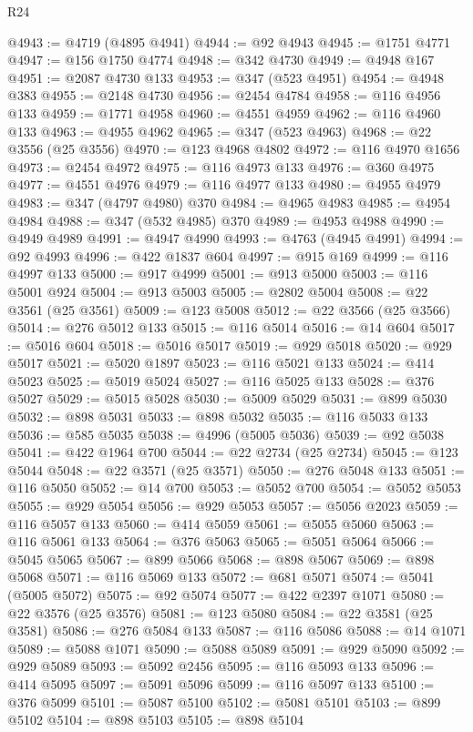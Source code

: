 \begin{lexlean}{R24}
\begin{coremodule}
{{{{{{{{{{{{{{{{{{{{{{{{{{{{{{{{{{{{{{{{{{{{{{{{{{{{{{{{{{{{{{{{{{{{{{{{{{{{{{{{{{{{{{{{{{{{{{{{{{{{{{{{{{{{{{{{{{{{{{{{{{{{{{{{{{{{{{{{{{{{{{{{{{{{{{{{{{{{{{{{{{{{{{{{{{{{{{{{{{{{{{{{{{{{{{{{{{{@4943 := @4719 (@4895 @4941)
@4944 := @92 @4943
@4945 := @1751 @4771
@4947 := @156 @1750 @4774
@4948 := @342 @4730
@4949 := @4948 @167
@4951 := @2087 @4730 @133
@4953 := @347 (@523 @4951)
@4954 := @4948 @383
@4955 := @2148 @4730
@4956 := @2454 @4784
@4958 := @116 @4956 @133
@4959 := @1771 @4958
@4960 := @4551 @4959
@4962 := @116 @4960 @133
@4963 := @4955 @4962
@4965 := @347 (@523 @4963)
@4968 := @22 @3556 (@25 @3556)
@4970 := @123 @4968 @4802
@4972 := @116 @4970 @1656
@4973 := @2454 @4972
@4975 := @116 @4973 @133
@4976 := @360 @4975
@4977 := @4551 @4976
@4979 := @116 @4977 @133
@4980 := @4955 @4979
@4983 := @347 (@4797 @4980) @370
@4984 := @4965 @4983
@4985 := @4954 @4984
@4988 := @347 (@532 @4985) @370
@4989 := @4953 @4988
@4990 := @4949 @4989
@4991 := @4947 @4990
@4993 := @4763 (@4945 @4991)
@4994 := @92 @4993
@4996 := @422 @1837 @604
@4997 := @915 @169
@4999 := @116 @4997 @133
@5000 := @917 @4999
@5001 := @913 @5000
@5003 := @116 @5001 @924
@5004 := @913 @5003
@5005 := @2802 @5004
@5008 := @22 @3561 (@25 @3561)
@5009 := @123 @5008
@5012 := @22 @3566 (@25 @3566)
@5014 := @276 @5012 @133
@5015 := @116 @5014
@5016 := @14 @604
@5017 := @5016 @604
@5018 := @5016 @5017
@5019 := @929 @5018
@5020 := @929 @5017
@5021 := @5020 @1897
@5023 := @116 @5021 @133
@5024 := @414 @5023
@5025 := @5019 @5024
@5027 := @116 @5025 @133
@5028 := @376 @5027
@5029 := @5015 @5028
@5030 := @5009 @5029
@5031 := @899 @5030
@5032 := @898 @5031
@5033 := @898 @5032
@5035 := @116 @5033 @133
@5036 := @585 @5035
@5038 := @4996 (@5005 @5036)
@5039 := @92 @5038
@5041 := @422 @1964 @700
@5044 := @22 @2734 (@25 @2734)
@5045 := @123 @5044
@5048 := @22 @3571 (@25 @3571)
@5050 := @276 @5048 @133
@5051 := @116 @5050
@5052 := @14 @700
@5053 := @5052 @700
@5054 := @5052 @5053
@5055 := @929 @5054
@5056 := @929 @5053
@5057 := @5056 @2023
@5059 := @116 @5057 @133
@5060 := @414 @5059
@5061 := @5055 @5060
@5063 := @116 @5061 @133
@5064 := @376 @5063
@5065 := @5051 @5064
@5066 := @5045 @5065
@5067 := @899 @5066
@5068 := @898 @5067
@5069 := @898 @5068
@5071 := @116 @5069 @133
@5072 := @681 @5071
@5074 := @5041 (@5005 @5072)
@5075 := @92 @5074
@5077 := @422 @2397 @1071
@5080 := @22 @3576 (@25 @3576)
@5081 := @123 @5080
@5084 := @22 @3581 (@25 @3581)
@5086 := @276 @5084 @133
@5087 := @116 @5086
@5088 := @14 @1071
@5089 := @5088 @1071
@5090 := @5088 @5089
@5091 := @929 @5090
@5092 := @929 @5089
@5093 := @5092 @2456
@5095 := @116 @5093 @133
@5096 := @414 @5095
@5097 := @5091 @5096
@5099 := @116 @5097 @133
@5100 := @376 @5099
@5101 := @5087 @5100
@5102 := @5081 @5101
@5103 := @899 @5102
@5104 := @898 @5103
@5105 := @898 @5104
}}}}}}}}}}}}}}}}}}}}}}}}}}}}}}}}}}}}}}}}}}}}}}}}}}}}}}}}}}}}}}}}}}}}}}}}}}}}}}}}}}}}}}}}}}}}}}}}}}}}}}}}}}}}}}}}}}}}}}}}}}}}}}}}}}}}}}}}}}}}}}}}}}}}}}}}}}}}}}}}}}}}}}}}}}}}}}}}}}}}}}}}}}}}}}}}}}}
\end{coremodule}
\end{lexlean}
